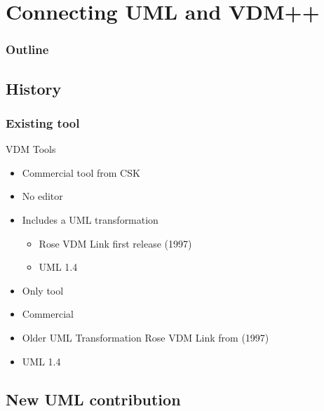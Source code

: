 %
%
\section{Connecting UML and VDM++}
%
%
\begin{frame}
  \frametitle{Outline}
  \tableofcontents[current]
\end{frame}


\subsection{History}
%
%
\frame
{
  \frametitle{Existing tool}

VDM Tools
  \begin{itemize}
  		\item<1-> Commercial tool from CSK
  		\item<2-> No editor
  		\item<3-> Includes a UML transformation
  		\begin{itemize}
  			\item Rose VDM Link first release (1997)
  			\item UML 1.4
  		\end{itemize}
	  	
  \end{itemize}


}


\note
{

  \begin{itemize}
  		\item Only tool
  		\item Commercial
  		\item Older UML Transformation Rose VDM Link from (1997)
  		\item UML 1.4
	  	
  \end{itemize}




}


\subsection{New UML contribution}

